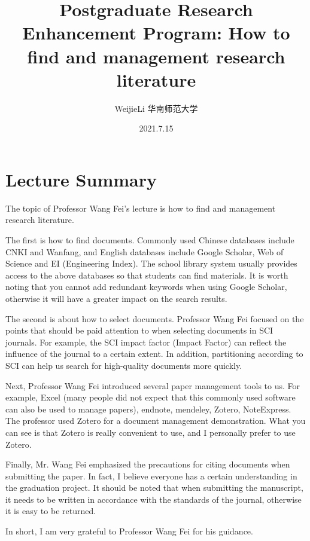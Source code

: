 \documentclass[UTF-8]{ctexart}
\title{Postgraduate Research Enhancement Program: How to find and management research literature}
\author{WeijieLi \quad 华南师范大学}
\date{2021.7.15}
\begin{document}
\maketitle
\thispagestyle{empty}
\clearpage

\pagestyle{plain}
\setcounter{page}{1}

\section{Lecture Summary}
The topic of Professor Wang Fei's lecture is how to find and management research literature.

The first is how to find documents. Commonly used Chinese databases include CNKI and Wanfang, and English databases include Google Scholar, Web of Science and EI (Engineering Index). The school library system usually provides access to the above databases so that students can find materials. It is worth noting that you cannot add redundant keywords when using Google Scholar, otherwise it will have a greater impact on the search results. 

The second is about how to select documents. Professor Wang Fei focused on the points that should be paid attention to when selecting documents in SCI journals. For example, the SCI impact factor (Impact Factor) can reflect the influence of the journal to a certain extent. In addition, partitioning according to SCI can help us search for high-quality documents more quickly. 

Next, Professor Wang Fei introduced several paper management tools to us. For example, Excel (many people did not expect that this commonly used software can also be used to manage papers), endnote, mendeley, Zotero, NoteExpress. The professor used Zotero for a document management demonstration. What you can see is that Zotero is really convenient to use, and I personally prefer to use Zotero. 

Finally, Mr. Wang Fei emphasized the precautions for citing documents when submitting the paper. In fact, I believe everyone has a certain understanding in the graduation project. It should be noted that when submitting the manuscript, it needs to be written in accordance with the standards of the journal, otherwise it is easy to be returned. 

In short, I am very grateful to Professor Wang Fei for his guidance. 
\end{document}
